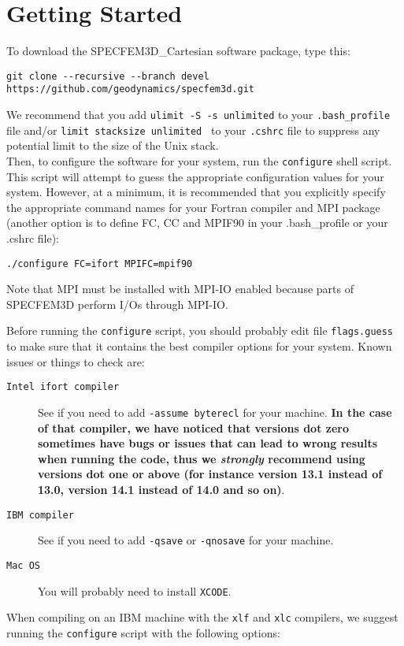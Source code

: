 \chapter{Getting Started}\label{cha:Getting-Started}

To download the SPECFEM3D\_Cartesian software package, type this:
\begin{verbatim}
git clone --recursive --branch devel https://github.com/geodynamics/specfem3d.git
\end{verbatim}
%
We recommend that you add {\texttt{ulimit -S -s unlimited}} to your
{\texttt{.bash\_profile}} file and/or {\texttt{limit stacksize
unlimited }} to your {\texttt{.cshrc}} file to suppress any potential
limit to the size of the Unix stack.\\


Then, to configure the software for your system, run the \texttt{configure}
shell script. This script will attempt to guess the appropriate configuration
values for your system. However, at a minimum, it is recommended that
you explicitly specify the appropriate command names for your Fortran
compiler and MPI package (another option is to define FC, CC and MPIF90
in your .bash\_profile or your .cshrc file):
\begin{verbatim}
./configure FC=ifort MPIFC=mpif90
\end{verbatim}
Note that MPI must be installed with MPI-IO enabled because parts of SPECFEM3D perform I/Os through MPI-IO.


Before running the \texttt{configure} script, you should probably
edit file \texttt{flags.guess} to make sure that it contains the best
compiler options for your system. Known issues or things to check
are:
\begin{description}
\item [{\texttt{Intel ifort compiler}}] See if you need to add \texttt{-assume byterecl} for your machine. \textbf{In the case of that compiler, we have noticed that versions dot zero sometimes have bugs or issues that can lead to wrong results when running the code, thus we \emph{strongly} recommend using versions dot one or above (for instance version 13.1 instead of 13.0, version 14.1 instead of 14.0 and so on)}.
\item [{\texttt{IBM compiler}}] See if you need to add \texttt{-qsave}
or \texttt{-qnosave} for your machine.
\item [{\texttt{Mac OS}}] You will probably need to install \texttt{XCODE}.
\end{description}
When compiling on an IBM machine with the \texttt{xlf} and \texttt{xlc}
compilers, we suggest running the \texttt{configure} script with the
following options:\\


